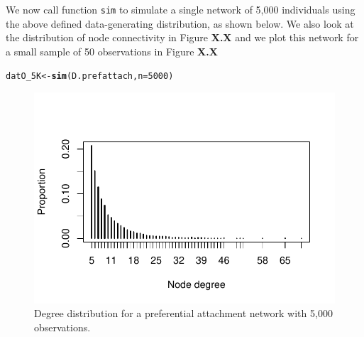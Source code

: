 \documentclass[english]{article}\usepackage[]{graphicx}\usepackage[]{color}
\makeatletter
\def\maxwidth{ %
  \ifdim\Gin@nat@width>\linewidth
    \linewidth
  \else
    \Gin@nat@width
  \fi
}
\newcommand{\hlnum}[1]{\textcolor[rgb]{0.686,0.059,0.569}{#1}}%
\newcommand{\hlstd}[1]{\textcolor[rgb]{0.345,0.345,0.345}{#1}}%
\newcommand{\hlkwb}[1]{\textcolor[rgb]{0.69,0.353,0.396}{#1}}%
\newcommand{\hlkwc}[1]{\textcolor[rgb]{0.333,0.667,0.333}{#1}}%
\newcommand{\hlkwd}[1]{\textcolor[rgb]{0.737,0.353,0.396}{\textbf{#1}}}%
\newenvironment{kframe}{%
 \def\at@end@of@kframe{}%
 \ifinner\ifhmode%
  \def\at@end@of@kframe{\end{minipage}}%
  \begin{minipage}{\columnwidth}%
 \fi\fi%
 \def\FrameCommand##1{\hskip\@totalleftmargin \hskip-\fboxsep
 \colorbox{shadecolor}{##1}\hskip-\fboxsep
     \hskip-\linewidth \hskip-\@totalleftmargin \hskip\columnwidth}%
 \MakeFramed {\advance\hsize-\width
   \@totalleftmargin\z@ \linewidth\hsize
   \@setminipage}}%
 {\par\unskip\endMakeFramed%
 \at@end@of@kframe}
\newenvironment{knitrout}{}{} %
\newcommand{\code}[1]{\mbox{\texttt{#1}}}
\theoremstyle{plain}
\theoremstyle{plain}
\makeatother
\begin{document}
We now call function \code{sim} to simulate a single network of 5,000 individuals using the above defined data-generating distribution, as shown below. We also look at the distribution of node connectivity in Figure \textbf{X.X} and we plot this network for a small sample of 50 observations in Figure \textbf{X.X}

\begin{knitrout}\footnotesize
{}\color{fgcolor}\begin{kframe}
\begin{alltt}
\hlstd{datO_5K} \hlkwb{<-} \hlkwd{sim}\hlstd{(D.prefattach,} \hlkwc{n} \hlstd{=} \hlnum{5000}\hlstd{)}
\end{alltt}
\end{kframe}
\end{knitrout}

\begin{knitrout}\footnotesize
{}\color{fgcolor}\begin{figure}[ht]

{\centering \includegraphics[width=\maxwidth]{TablesFigs/knitR-unnamed-chunk-10-1} 

}

\caption[Degree distribution for a preferential attachment network with 5,000 observations]{Degree distribution for a preferential attachment network with 5,000 observations.}\label{fig:unnamed-chunk-10}
\end{figure}


\end{knitrout}
\end{document}
